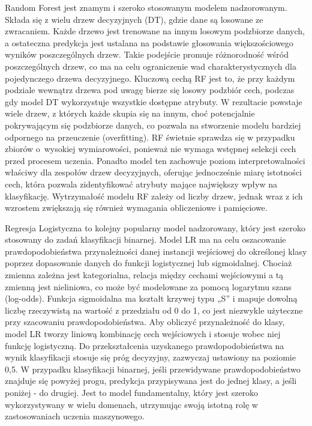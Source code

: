 \documentclass [runningheads]{llncs}
\begin{document}
Random Forest jest znamym i szeroko stosowanym modelem nadzorowanym. Składa się z wielu drzew decyzyjnych (DT), gdzie dane są losowane ze zwracaniem. Każde drzewo jest trenowane na innym losowym podzbiorze danych, a ostateczna predykcja jest ustalana na podstawie głosowania większościowego wyników poszczególnych drzew.
Takie podejście promuje różnorodność wśród poszczególnych drzew, co ma na celu ograniczenie wad charakterystycznych dla pojedynczego drzewa decyzyjnego.
Kluczową cechą RF jest to, że przy każdym podziale wewnątrz drzewa pod uwagę bierze się losowy podzbiór cech, podczas gdy model DT wykorzystuje wszystkie dostępne atrybuty.
W rezultacie powstaje wiele drzew, z których każde skupia się na innym, choć potencjalnie pokrywającym się podzbiorze danych, co pozwala na stworzenie modelu bardziej odpornego na przeuczenie (overfitting).
RF świetnie sprawdza się w przypadku zbiorów o~wysokiej wymiarowości, ponieważ nie wymaga wstępnej selekcji cech przed procesem uczenia.
Ponadto model ten zachowuje poziom interpretowalności właściwy dla zespołów drzew decyzyjnych, oferując jednocześnie miarę istotności cech, która pozwala zidentyfikować atrybuty mające największy wpływ na klasyfikację.
Wytrzymałość modelu RF zależy od liczby drzew, jednak wraz z ich wzrostem zwiększają się również wymagania obliczeniowe i pamięciowe.

Regresja Logistyczna to kolejny popularny model nadzorowany, który jest szeroko stosowany do zadań klasyfikacji binarnej.
Model LR ma na celu oszacowanie prawdopodobieństwa przynależności danej instancji wejściowej do określonej klasy poprzez dopasowanie danych do funkcji logistycznej lub sigmoidalnej.
Chociaż zmienna zależna jest kategorialna, relacja między cechami wejściowymi a tą zmienną jest nieliniowa, co może być modelowane za pomocą logarytmu szans (log-odds).
Funkcja sigmoidalna ma kształt krzywej typu „S” i mapuje dowolną liczbę rzeczywistą na wartość z przedziału od 0 do 1, co jest niezwykle użyteczne przy szacowaniu prawdopodobieństwa.
Aby obliczyć przynależność do klasy, model LR tworzy liniową kombinację cech wejściowych i stosuje wobec niej funkcję logistyczną.
Do przekształcenia uzyskanego prawdopodobieństwa na wynik klasyfikacji stosuje się próg decyzyjny, zazwyczaj ustawiony na poziomie 0,5.
W przypadku klasyfikacji binarnej, jeśli przewidywane prawdopodobieństwo znajduje się powyżej progu, predykcja przypisywana jest do jednej klasy, a jeśli poniżej - do drugiej.
Jest to model fundamentalny, który jest szeroko wykorzystywany w wielu domenach, utrzymując swoją istotną rolę w zastosowaniach uczenia maszynowego.
\end{document}
